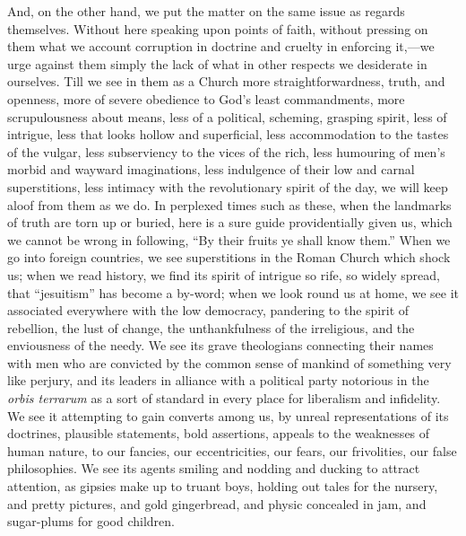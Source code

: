 And, on the other hand, we put the matter on the
same issue as regards themselves. Without here speaking upon points of
faith, without pressing on them what we account corruption in doctrine
and cruelty in enforcing it,—we urge against them simply the lack of
what in other respects we desiderate in ourselves. Till we see in them
as a Church more straightforwardness, truth, and openness, more
of severe obedience to God's least commandments, more scrupulousness
about means, less of a political, scheming, grasping spirit, less of
intrigue, less that looks hollow and superficial, less accommodation
to the tastes of the vulgar, less subserviency to the vices of the
rich, less humouring of men's morbid and wayward imaginations, less
indulgence of their low and carnal superstitions, less intimacy with
the revolutionary spirit of the day, we will keep aloof from them as
we do. In perplexed times such as these, when the landmarks of truth
are torn up or buried, here is a sure guide providentially given us,
which we cannot be wrong in following, ``By their fruits ye shall
know them.'' When we go into foreign countries, we see superstitions
in the Roman Church which shock us; when we read history, we find its
spirit of intrigue so rife, so widely spread, that ``jesuitism'' has
become a by-word; when we look round us at home, we see it associated
everywhere with the low democracy, pandering to the spirit of
rebellion, the lust of change, the unthankfulness of the irreligious,
and the enviousness of the needy. We see its grave theologians
connecting their names with men who are convicted by the common sense
of mankind of something very like perjury, and its leaders in alliance
with a political party notorious in the \emph{orbis terrarum} as a
sort of standard in every place for liberalism and infidelity. We see
it attempting to gain converts among us, by unreal representations of
its doctrines, plausible statements, bold assertions, appeals to the
weaknesses of human nature, to our fancies, our eccentricities, our
fears, our frivolities, our false philosophies. We see its agents
smiling and nodding and ducking to attract attention, as gipsies make
up to truant boys, holding out tales for the nursery, and pretty
pictures, and gold gingerbread, and physic concealed in jam, and
sugar-plums for good children.

